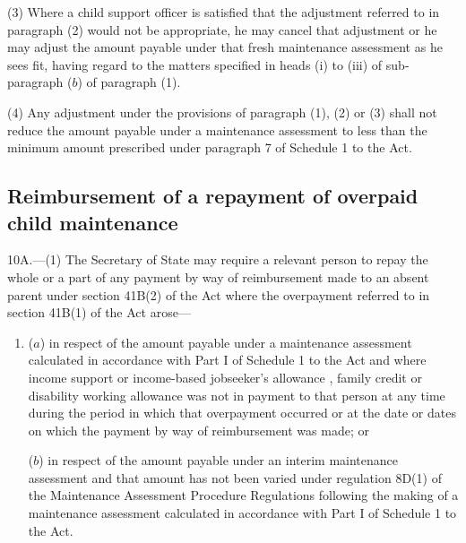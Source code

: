 \documentclass[12pt,a4paper]{article}
\begin{document}
(3) Where a child support officer is satisfied that the adjustment referred to in paragraph (2) would not be appropriate, he may cancel that adjustment or he may adjust the amount payable under that fresh maintenance assessment as he sees fit, having regard to the matters specified in heads (i) to (iii) of sub-paragraph ($b$) of paragraph (1).

(4) Any adjustment under the provisions of paragraph (1), (2) or (3) shall not reduce the amount payable under a maintenance assessment to less than the minimum amount prescribed under paragraph 7 of Schedule 1 to the Act.



\subsection[10A. Reimbursement of a repayment of overpaid child maintenance]{Reimbursement of a repayment of overpaid child maintenance}

10A.—(1) The Secretary of State may require a relevant person to repay the whole or a part of any payment by way of reimbursement made to an absent parent under section 41B(2) of the Act where the overpayment referred to in section 41B(1) of the Act arose—
\begin{enumerate}\item[]
($a$) in respect of the amount payable under a maintenance assessment calculated in accordance with Part I of Schedule 1 to the Act and where income support
or income-based jobseeker’s allowance%
, family credit or disability working allowance was not in payment to that person at any time during the period in which that overpayment occurred or at the date or dates on which the payment by way of reimbursement was made; or

($b$) in respect of the amount payable under an interim maintenance assessment and that amount has not been varied under regulation 8D(1) of the Maintenance Assessment Procedure Regulations following the making of a maintenance assessment calculated in accordance with Part I of Schedule 1 to the Act.
\end{enumerate}
\end{document}
